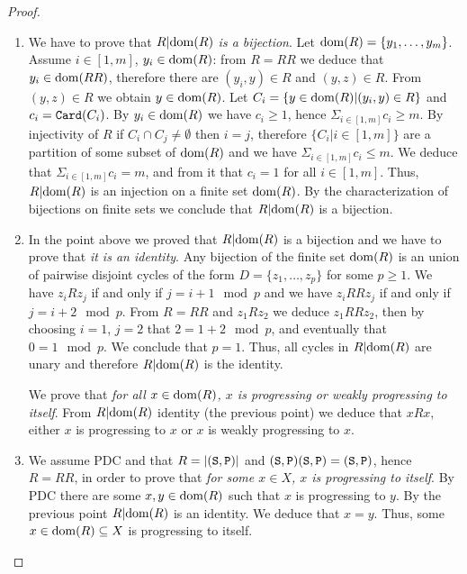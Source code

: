 \documentclass{lmcs}
\begin{document}
\begin{proof}
\begin{enumerate}
\item
We have to prove that \emph{$R {|} {\rm dom}(R) $ is a bijection}. 
Let ${\rm dom}(R) = \{y_1, \ldots, y_m\}$. Assume
$i \in [1,m]$, $y_i \in {\rm dom}(R)$: 
from $R=RR$ we deduce that $y_i \in {\rm dom}(RR)$, therefore
there are $(y_i,y) \in R$ and $(y,z) \in R$. From $(y,z) \in R$ 
we obtain $y \in {\rm dom}(R)$. 
Let $C_i = \{y \in {\rm dom}(R) |(y_i,y) \in R\}$ and $c_i = {\tt Card}(C_i)$. 
By $y_i \in {\rm dom}(R)$ 
we have $c_i \ge 1$, hence $\Sigma_{i \in [1,m]} c_i \ge m$. 
By injectivity of $R$ if  $C_i \cap C_j \not = \emptyset$ then $i=j$, therefore 
$\{C_i | i \in [1,m]\}$ are a partition of some subset of ${\rm dom}(R)$
and we have $\Sigma_{i \in [1,m]} c_i \le m$. 
We deduce that $\Sigma_{i \in [1,m]} c_i  = m$,
and from it that $c_i=1$ for all $i \in [1,m]$. Thus, 
$R {|} {\rm dom}(R) $ is an injection on a finite set ${\rm dom}(R)$.
By the characterization of bijections on finite sets we 
conclude that $R {|} {\rm dom}(R) $ is a bijection.

\item
In the point above we proved that $R {|} {\rm dom}(R) $ is 
a bijection and we have to prove that \emph{it is an identity}. Any bijection
of the finite set ${\rm dom}(R)$ is an union of pairwise disjoint cycles of the form 
$D = \{z_1, \ldots, z_p\}$ for some $p \ge 1$. We have $z_i R z_j$
if and only if $j = i+1 \mod p$ and we have
$z_i RR z_j$ if and only if $j = i+2 \mod p$.
From $R=RR$ and $z_1 R z_2$ we deduce $z_1 RR z_2$, then by choosing
$i=1$, $j=2$ that $2=1+2 \mod p$, and eventually that $0=1 \mod p$. 
We conclude that $p=1$. Thus, all cycles in
$R {|} {\rm dom}(R) $ are unary and therefore
$R {|} {\rm dom}(R) $ is the identity.

We prove that \emph{for all $x \in {\rm dom}(R)$, $x$ is progressing or 
weakly progressing to itself}.
From $R {|} {\rm dom}(R)$ identity (the previous point)
we deduce that $x R x$, either $x$ is progressing to $x$ or 
$x$ is weakly progressing to $x$.

\item
We assume PDC and that $R = {| ({\tt S},{\tt P}) |}$ and $({\tt S},{\tt P}) ({\tt S},{\tt P}) = 
({\tt S},{\tt P})$, hence $R=RR$, 
in order to prove that \emph{for some $x \in X$, $x$ is progressing to itself}.
By PDC there are some $x,y \in {\rm dom}(R)$ such that $x$ is progressing to $y$.
By the previous point $R {|} {\rm dom}(R) $ is an identity.
We deduce that $x=y$. Thus, some $x \in {\rm dom}(R) \subseteq X$ is progressing to itself.

\end{enumerate}
\end{proof}
\end{document}
